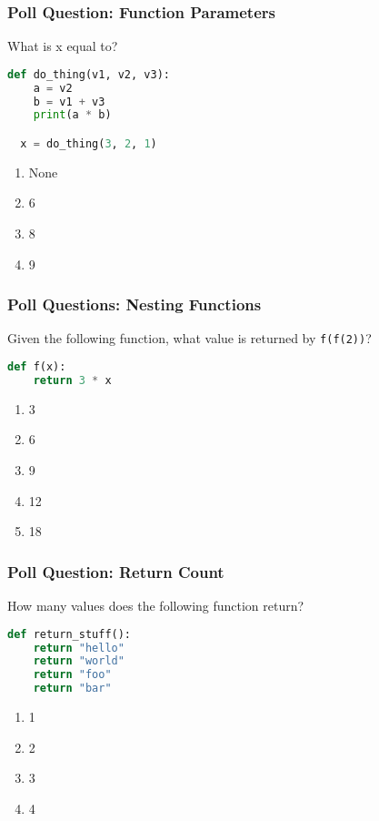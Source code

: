 \documentclass{beamer}
\begin{document}
%
%
\begin{frame}[fragile]
  \frametitle{Poll Question: Function Parameters}
  What is x equal to?
  \begin{lstlisting}[language=Python, autogobble]
  def do_thing(v1, v2, v3):
    a = v2
    b = v1 + v3
    print(a * b)

  x = do_thing(3, 2, 1)
  \end{lstlisting}
  \vfill
  \begin{enumerate}[A]
    \item None
    \item 6
    \item 8 
    \item 9
  \end{enumerate}
\end{frame}

%
%
\begin{frame}[fragile]
  \frametitle{Poll Questions: Nesting Functions}
  Given the following function, what value is returned by \lstinline|f(f(2))|?
  \begin{lstlisting}[language=Python, autogobble]
  def f(x):
    return 3 * x
  \end{lstlisting}
  \vfill
  \begin{enumerate}[A]
    \item 3
    \item 6
    \item 9
    \item 12
    \item 18
  \end{enumerate}
\end{frame}

%
%
\begin{frame}[fragile]
  \frametitle{Poll Question: Return Count} 
  How many values does the following function return?
  \begin{lstlisting}[language=Python, autogobble]
  def return_stuff():
    return "hello"
    return "world"
    return "foo"
    return "bar"
  \end{lstlisting}
  \vfill
  \begin{enumerate}[A]
    \item 1
    \item 2
    \item 3
    \item 4
  \end{enumerate}
\end{frame}
\end{document}
